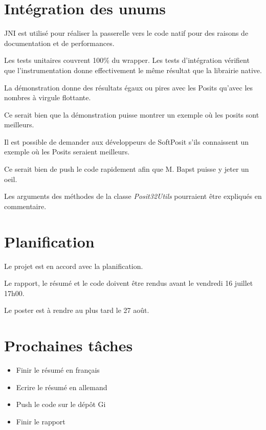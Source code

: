 \documentclass[11pt]{meetingmins}
\begin{document}
\section{Intégration des unums}
\begin{hiddenitems}
    \item JNI est utilisé pour réaliser la passerelle vers le code natif pour des raisons de documentation et de performances.
    \item Les tests unitaires couvrent 100\% du wrapper. Les tests d'intégration vérifient que l'instrumentation donne effectivement le même résultat que la librairie native.
    \item La démonstration donne des résultats égaux ou pires avec les Posits qu'avec les nombres à virgule flottante.
    \item Ce serait bien que la démonstration puisse montrer un exemple où les posits sont meilleurs.
    \item Il est possible de demander aux développeurs de SoftPosit s'ils connaissent un exemple où les Posits seraient meilleurs.
    \item Ce serait bien de push le code rapidement afin que M. Bapst puisse y jeter un oeil.
    \item Les arguments des méthodes de la classe \textit{Posit32Utils} pourraient être expliqués en commentaire.
\end{hiddenitems}

\section{Planification}
\begin{hiddenitems}
    \item Le projet est en accord avec la planification.
    \item Le rapport, le résumé et le code doivent être rendus avant le vendredi 16 juillet 17h00.
    \item Le poster est à rendre au plus tard le 27 août.
\end{hiddenitems}

\section{Prochaines tâches}
\begin{itemize}
    \item Finir le résumé en français
    \item Ecrire le résumé en allemand
    \item Push le code sur le dépôt Gi
    \item Finir le rapport
\end{itemize}
\end{document}
